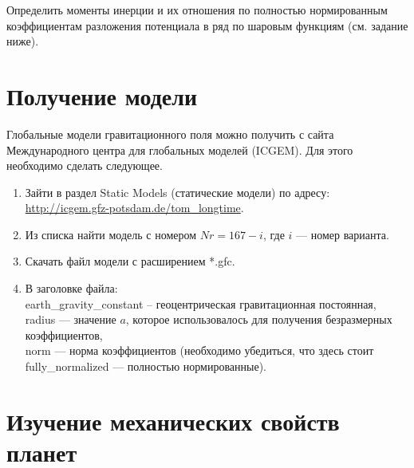 \documentclass[11pt, a4paper,addpoints]{exam}
\theoremstyle{remark}
\begin{document}
\begin{questions}
        \question[2] Определить моменты инерции и их отношения по полностью нормированным
        коэффициентам разложения потенциала в ряд по шаровым функциям (см. задание ниже).
    \end{questions}
    \section*{\centering Получение модели}
    Глобальные модели гравитационного поля можно получить с сайта Международного центра для глобальных
    моделей (ICGEM). Для этого необходимо сделать следующее.
    \begin{enumerate}
        \item Зайти в раздел Static Models (статические модели) по адресу:\\
            \url{http://icgem.gfz-potsdam.de/tom_longtime}.
        \item Из списка найти модель с номером $Nr = 167 - i$, где $i$ --- номер варианта.
        \item Скачать файл модели с расширением *.gfc.
        \item В заголовке файла: \\
            earth\_gravity\_constant -- геоцентрическая гравитационная постоянная, \\
            radius --- значение $a$, которое использовалось для получения безразмерных
            коэффициентов, \\
            norm --- норма коэффициентов (необходимо убедиться, что здесь стоит fully\_normalized
            --- полностью нормированные).
    \end{enumerate}
    \newpage
    \section*{\centering Изучение механических свойств планет}
\end{document}
